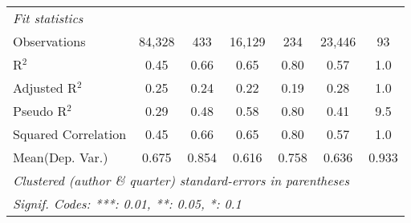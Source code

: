 \begin{tabular}{lcccccc}
   \midrule
   \emph{Fit statistics}\\
   Observations                                               & 84,328  & 433           & 16,129         & 234          & 23,446        & 93\\  
   R$^2$                                                      & 0.45    & 0.66          & 0.65           & 0.80         & 0.57          & 1.0\\  
   Adjusted R$^2$                                             & 0.25    & 0.24          & 0.22           & 0.19         & 0.28          & 1.0\\  
   Pseudo R$^2$                                               & 0.29    & 0.48          & 0.58           & 0.80         & 0.41          & 9.5\\  
   Squared Correlation                                        & 0.45    & 0.66          & 0.65           & 0.80         & 0.57          & 1.0\\  
Mean(Dep. Var.) & 0.675 & 0.854 & 0.616 & 0.758 & 0.636 & 0.933 \\
   \midrule \midrule
   \multicolumn{7}{l}{\emph{Clustered (author \& quarter) standard-errors in parentheses}}\\
   \multicolumn{7}{l}{\emph{Signif. Codes: ***: 0.01, **: 0.05, *: 0.1}}\\
\end{tabular}
\par\endgroup
